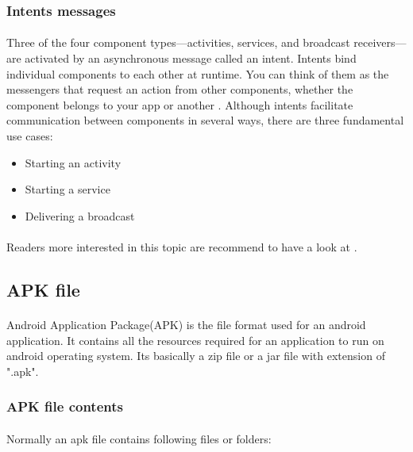 \documentclass[../main.tex]{subfile}
\begin{document}
		\subsubsection{Intents messages}\label{sec:intents}
			\paragraph{} Three of the four component types—activities, services, and broadcast receivers—are activated by an asynchronous message called an intent. Intents bind individual components to each other at runtime. You can think of them as the messengers that request an action from other components, whether the component belongs to your app or another \cite{app_fundamentals}. Although intents facilitate communication between components in several ways, there are three fundamental use cases:
				\begin{itemize}
					\item Starting an activity
					\item Starting a service
					\item Delivering a broadcast
				\end{itemize}
			\paragraph{} Readers more interested in this topic are recommend to have a look at \cite{intents}.
			
			
	\subsection{APK file}\label{sec:apk}	
		\paragraph{} Android Application Package(APK) is the file format used for an android application. It contains all the resources required for an application to run on android operating system. Its basically a zip file or a jar file with extension of ".apk"\cite{APK_structure}.
		
		\subsubsection{APK file contents} \label{sec:apk_file_contents}
		\paragraph{} Normally an apk file contains following files or folders:
		
\end{document}
